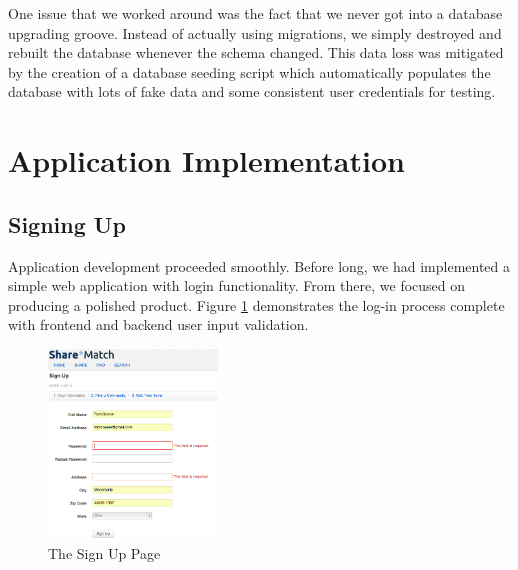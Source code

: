\documentclass{acm_proc_article-sp}
\begin{document}
One issue that we worked around was the fact that we never got into a database upgrading groove. Instead of actually
using migrations, we simply destroyed and rebuilt the database whenever the schema changed. This data loss was mitigated
by the creation of a database seeding script which automatically populates the database with lots of fake data and some
consistent user credentials for testing.

\section{Application Implementation}
\subsection{Signing Up}
Application development proceeded smoothly. Before long, we had implemented a simple web application with login functionality.
From there, we focused on producing a polished product. Figure \ref{fig:SignUpPage.png} demonstrates the log-in process
complete with frontend and backend user input validation.
\begin{figure}[h]
\begin{centering}
\includegraphics[width=0.4\textwidth]{SignUpPage.png} %
\caption{The Sign Up Page}
\label{fig:SignUpPage.png}
\end{centering}
\end{figure}
\end{document}
